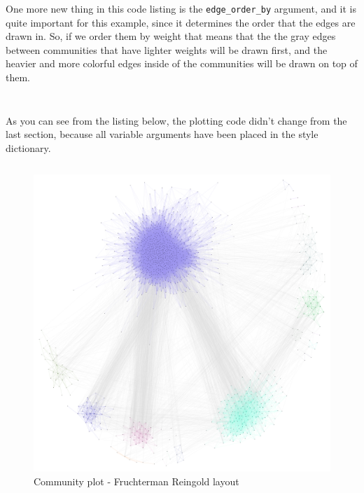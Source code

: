 \documentclass[12pt, a4paper]{article}
\begin{document}
One more new thing in this code listing is the \texttt{edge\_order\_by} argument, and it is quite important for this example, since it determines the order that the edges are drawn in. So, if we order them by weight that means that the the gray edges between communities that have lighter weights will be drawn first, and the heavier and more colorful edges inside of the communities will be drawn on top of them.

\bgroup
  \inputminted[linenos, breaklines=true, fontsize=\scriptsize, firstnumber=last]{python}{src/youtube/hdg_com/5_styling_prop.py}
  \label{listing:iplot_5sg}
\egroup

\bgroup
  \inputminted[linenos, breaklines=true, fontsize=\scriptsize, firstnumber=last]{python}{src/youtube/hdg_com/6_style_dict.py}
  \label{listing:iplot_6sd}
\egroup


As you can see from the listing below, the plotting code didn't change from the last section, because all variable arguments have been placed in the style dictionary.

\bgroup
  \inputminted[linenos, breaklines=true, fontsize=\scriptsize, firstnumber=last]{python}{src/youtube/hdg_com/7_plotting.py}
  \label{listing:iplot_7sv}
\egroup

\begin{figure}[H]
    \centering
    \includegraphics[width=\textwidth]{src/youtube/hdg_com/hdg_com}
    \caption{Community plot - Fruchterman Reingold layout}
    \label{fig:hdg_com}
\end{figure}
\end{document}
